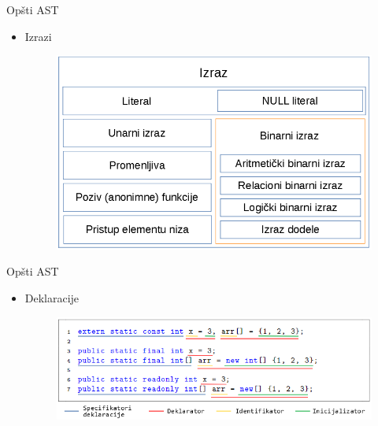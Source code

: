 \documentclass{beamer}
\begin{document}
\begin{frame}{Op\v{s}ti AST}
    \begin{itemize}
        \item Izrazi
        \begin{figure}[h!]
            \centering
            \includegraphics[scale=0.5]{images/expression_nodes.png}
        \end{figure}
    \end{itemize}
\end{frame}

\begin{frame}{Op\v{s}ti AST}
    \begin{itemize}
        \item Deklaracije
        \begin{figure}[h!]
            \centering
            \includegraphics[scale=0.65]{images/declaration_decomposition.png}
        \end{figure}
    \end{itemize}
\end{frame}
\end{document}
